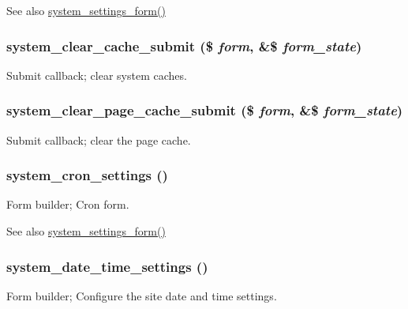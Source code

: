 \begin{DoxySeeAlso}{See also}
\hyperlink{group__forms_ga6fb270d34465d846cd4659a85d3e40c8}{system\_\-settings\_\-form()} 
\end{DoxySeeAlso}
\hypertarget{group__forms_ga07cc959f377e07b079d9875fc5c4b1b7}{
\subsubsection[{system\_\-clear\_\-cache\_\-submit}]{\setlength{\rightskip}{0pt plus 5cm}system\_\-clear\_\-cache\_\-submit (\$ {\em form}, \/  \&\$ {\em form\_\-state})}}
\label{group__forms_ga07cc959f377e07b079d9875fc5c4b1b7}
Submit callback; clear system caches. \hypertarget{group__forms_ga583e36fa591f3e82feae6bf41b597aac}{
\subsubsection[{system\_\-clear\_\-page\_\-cache\_\-submit}]{\setlength{\rightskip}{0pt plus 5cm}system\_\-clear\_\-page\_\-cache\_\-submit (\$ {\em form}, \/  \&\$ {\em form\_\-state})}}
\label{group__forms_ga583e36fa591f3e82feae6bf41b597aac}
Submit callback; clear the page cache. \hypertarget{group__forms_ga62cfa00c0b29765c5c4fa670e222b522}{
\subsubsection[{system\_\-cron\_\-settings}]{\setlength{\rightskip}{0pt plus 5cm}system\_\-cron\_\-settings ()}}
\label{group__forms_ga62cfa00c0b29765c5c4fa670e222b522}
Form builder; Cron form.

\begin{DoxySeeAlso}{See also}
\hyperlink{group__forms_ga6fb270d34465d846cd4659a85d3e40c8}{system\_\-settings\_\-form()} 
\end{DoxySeeAlso}
\hypertarget{group__forms_ga2c5e3711c4a19fa4759efcee41487070}{
\subsubsection[{system\_\-date\_\-time\_\-settings}]{\setlength{\rightskip}{0pt plus 5cm}system\_\-date\_\-time\_\-settings ()}}
\label{group__forms_ga2c5e3711c4a19fa4759efcee41487070}
Form builder; Configure the site date and time settings.

